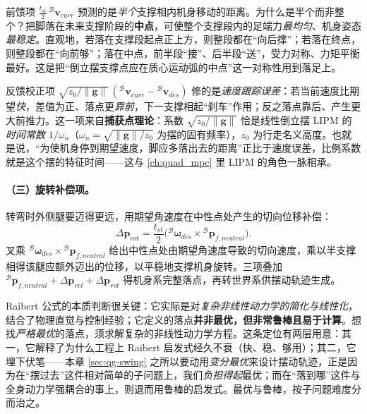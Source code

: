 \begin{insight}[为何是半个支撑相中点]\label{ins:qg-half-stance}
前馈项 $\tfrac{t_{st}}{2}\,{}^{\mathcal{B}}\mathbf{v}_{curr}$ 预测的是\emph{半个}支撑相内机身移动的距离。为什么是半个而非整个？把脚落在未来支撑阶段的\textbf{中点}，可使整个支撑段内的足端力\emph{最均匀}、机身姿态\emph{最稳定}\cite{unitree2023quadruped}。直观地，若落在支撑段起点正上方，则整段都在“向后撑”；若落在终点，则整段都在“向前够”；落在中点，前半段“接”、后半段“送”，受力对称、力矩平衡最好。这是把“倒立摆支撑点应在质心运动弧的中点”这一对称性用到落足上。
\end{insight}

\begin{insight}[反馈校正项 = 捕获点刹车]\label{ins:qg-capture}
反馈校正项 $\sqrt{z_0/\|\boldsymbol{g}\|}\,({}^{\mathcal{B}}\mathbf{v}_{curr}-{}^{\mathcal{B}}\mathbf{v}_{des})$ 修的是\emph{速度跟踪误差}：若当前速度比期望\emph{快}，差值为正、落点更\emph{靠前}，下一支撑相起“刹车”作用；反之落点靠后、产生更大前推力\cite{unitree2023quadruped}。这一项来自\textbf{捕获点理论}\cite{pratt2006capture}：系数 $\sqrt{z_0/\|\boldsymbol{g}\|}$ 恰是线性倒立摆 LIPM\cite{kajita2001lipm} 的\emph{时间常数} $1/\omega_n$（$\omega_n=\sqrt{\|\boldsymbol{g}\|/z_0}$ 为摆的固有频率），$z_0$ 为行走名义高度。也就是说，“为使机身停到期望速度，脚应多落出去的距离”正比于速度误差，比例系数就是这个摆的特征时间——这与 \cref{ch:quad_mpc} 里 LIPM 的角色一脉相承。
\end{insight}

\paragraph{（三）旋转补偿项。}
转弯时外侧腿要迈得更远，用期望角速度在中性点处产生的切向位移补偿\cite{unitree2023quadruped}：
\begin{equation}
  \Delta\mathbf{p}_{rot}=\frac{t_{st}}{2}\big({}^{\mathcal{B}}\boldsymbol{\omega}_{des}\times{}^{\mathcal{B}}\mathbf{p}_{f,neutral}\big).
  \label{eq:qg-raibert-rot}
\end{equation}
叉乘 ${}^{\mathcal{B}}\boldsymbol{\omega}_{des}\times{}^{\mathcal{B}}\mathbf{p}_{f,neutral}$ 给出中性点处由期望角速度导致的切向速度，乘以半支撑相得该腿应额外迈出的位移，以平稳地支撑机身旋转。三项叠加 ${}^{\mathcal{B}}\mathbf{p}_{f,neutral}+\Delta\mathbf{p}_{vel}+\Delta\mathbf{p}_{rot}$ 得机身系完整落点，再转世界系供摆动轨迹生成。

\begin{insight}\label{ins:qg-raibert-nature}
Raibert 公式的本质判断很关键：它实际是对\emph{复杂非线性动力学的简化与线性化}，结合了物理直觉与控制经验；它定义的落点\textbf{并非最优，但非常鲁棒且易于计算}\cite{unitree2023quadruped}。想找\emph{严格最优}的落点，须求解复杂的非线性动力学方程。这条定位有两层用意：其一，它解释了为什么工程上 Raibert 启发式经久不衰（快、稳、够用）；其二，它埋下伏笔——本章 \cref{sec:qg-swing} 之所以要动用\emph{变分最优}来设计摆动轨迹，正是因为在“摆过去”这件相对简单的子问题上，我们\emph{负担得起}最优；而在“落到哪”这件与全身动力学强耦合的事上，则退而用鲁棒的启发式。最优与鲁棒，按子问题难度分而治之。
\end{insight}

